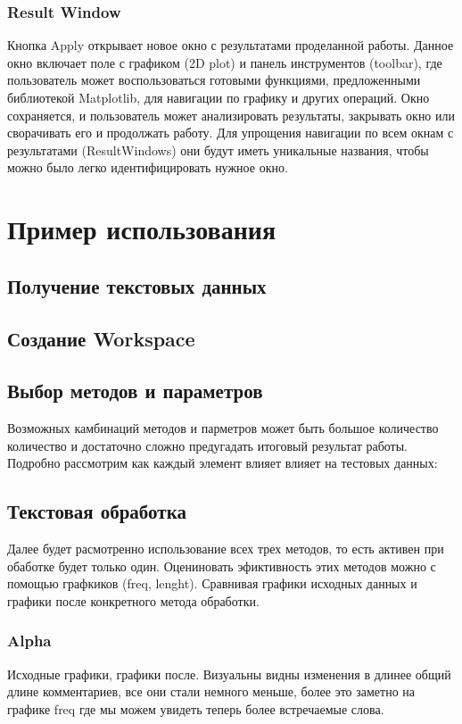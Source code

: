 		\subsubsection{Result Window}		
			Кнопка Apply открывает новое окно с результатами проделанной работы. Данное окно включает поле с графиком (2D plot) и панель инструментов (toolbar), где пользователь может воспользоваться готовыми функциями, предложенными библиотекой Matplotlib, для навигации по графику и других операций. Окно сохраняется, и пользователь может анализировать результаты, закрывать окно или сворачивать его и продолжать работу. Для упрощения навигации по всем окнам с результатами (ResultWindows) они будут иметь уникальные названия, чтобы можно было легко идентифицировать нужное окно.
			

\section{Пример использования}
		
	\subsection{Получение текстовых данных}
		
	\subsection{Создание Workspace}
		
	\subsection{Выбор методов и параметров} 
		Возможных камбинаций методов и парметров может быть большое количество количество и достаточно сложно предугадать итоговый результат работы. Подробно рассмотрим как каждый элемент влияет влияет на тестовых данных:
		
	\subsection{Текстовая обработка} 
		Далее будет расмотренно использование всех трех методов, то есть активен при обаботке будет только один. Оцениновать эфиктивность этих методов можно с помощью графкиков (freq, lenght). Сравнивая графики исходных данных и графики после конкретного метода обработки.
		
		\subsubsection{Alpha}
			Исходные графики, графики после. Визуальны видны изменения в длинее общий длине комментариев, все они стали немного меньше, более это заметно на графике freq где мы можем увидеть теперь более встречаемые слова. 
				
